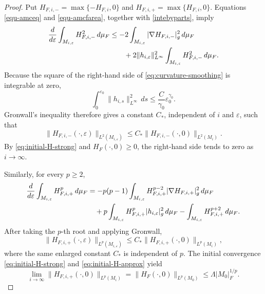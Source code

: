 \documentclass[11pt,reqno]{amsart}
\theoremstyle{definition}
\theoremstyle{remark}
\numberwithin{equation}{section}
\begin{document}
\begin{proof}
Put $ H_{F,i,-}=\max\{-H_{F,i},0\}$ and $ H_{F,i,+}=\max\{H_{F,i},0\}$. 
Equations \eqref{equ-amceq} and \eqref{equ-amcfarea}, together with \eqref{intebyparts}, imply
\begin{align*}
 \frac{d}{d\varepsilon}\int_{M_{i,\varepsilon}}H_{F,i,-}^2\,d\mu_F
 &\leq-2\int_{M_{i,\varepsilon}}
 |\nabla H_{F,i,-}|_{g}^2\,d\mu_F \notag\\
 &\qquad+2\|h_{i,\varepsilon}\|_{L^\infty}^2
 \int_{M_{i,\varepsilon}}H_{F,i,-}^2\,d\mu_F.
\end{align*}
Because the square of the right-hand side of \eqref{eq:curvature-smoothing} is integrable at zero,
\begin{equation*}
 \int_0^{\varepsilon_0}\|h_{i,s}\|_{L^\infty}^2\,ds
 \leq \frac{C}{\gamma_0}\varepsilon_0^{\gamma_0}.
\end{equation*}
Gronwall's inequality therefore gives a constant $C_*$, independent of $i$ and $\varepsilon$, such that
\begin{equation}
\label{eq:negative-part-approximants-bound}
 \|H_{F,i,-}(\cdot,\varepsilon)\|_{L^2(M_{i,\varepsilon})}
 \leq C_*\|H_{F,i,-}(\cdot,0)\|_{L^2(M_i)}.
\end{equation}
By \eqref{eq:initial-H-strong} and $H_F(\cdot,0)\geq0$, the right-hand side tends to zero as $i\to\infty$.

Similarly, for every $p\geq2$,
\begin{align*}
 \frac{d}{d\varepsilon}\int_{M_{i,\varepsilon}}H_{F,i,+}^p\,d\mu_F
 &=-p(p-1)\int_{M_{i,\varepsilon}}H_{F,i,+}^{p-2}
 |\nabla H_{F,i,+}|_{g}^2\,d\mu_F \notag\\
 &\quad+p\int_{M_{i,\varepsilon}}H_{F,i,+}^p
 |h_{i,\varepsilon}|_{g}^2\,d\mu_F
 -\int_{M_{i,\varepsilon}}H_{F,i,+}^{p+2}\,d\mu_F.
\end{align*}
After taking the $p$-th root and applying Gronwall,
\begin{equation}
\label{eq:positive-part-approximants-bound}
 \|H_{F,i,+}(\cdot,\varepsilon)\|_{L^p(M_{i,\varepsilon})}
 \leq C_*\|H_{F,i,+}(\cdot,0)\|_{L^p(M_i)},
\end{equation}
where the same enlarged constant $C_*$ is independent of $p$. The initial convergence \eqref{eq:initial-H-strong} and \eqref{eq:initial-H-approx} yield
\begin{equation}
\label{eq:initial-positive-Lp}
 \lim_{i\to\infty}\|H_{F,i,+}(\cdot,0)\|_{L^p(M_i)}
 =\|H_F(\cdot,0)\|_{L^p(M_0)}
 \leq\Lambda |M_0|_F^{1/p}.
\end{equation}



\end{proof}
\end{document}
